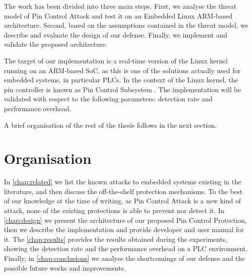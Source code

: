 The work has been divided into three main steps.
First, we analyse the threat model of Pin Control Attack and test it on an Embedded Linux ARM-based architecture.
Second, based on the assumptions contained in the threat model, we describe and evaluate the design of our defense.
Finally, we implement and validate the proposed architecture.

The target of our implementation is a real-time version of the Linux kernel running on an ARM-based SoC,
as this is one of the solutions actually used for embedded systems, in particular PLCs.
In the context of the Linux kernel, the pin controller is known as Pin Control Subsystem \cite{pinctrl}.
The implementation will be validated with respect to the following parameters: detection rate and performance overhead.

A brief organisation of the rest of the thesis follows in the next section.


\section{Organisation}

In \chap \ref{chap:related} we list the known attacks to embedded systems existing in the literature, and then discuss the off-the-shelf protection mechanisms.
To the best of our knowledge at the time of writing, as Pin Control Attack is a new kind of attack, none of the existing protections is able to prevent nor detect it.
In \chap \ref{chap:design} we present the architecture of our proposed Pin Control Protection, then we describe the implementation and provide developer and user manual for it.
The \chap \ref{chap:results} provides the results obtained during the experiments, showing the detection rate and the performance overhead on a PLC environment.
Finally, in \chap \ref{chap:conclusions} we analyse the shortcomings of our defense and the possible future works and improvements.
